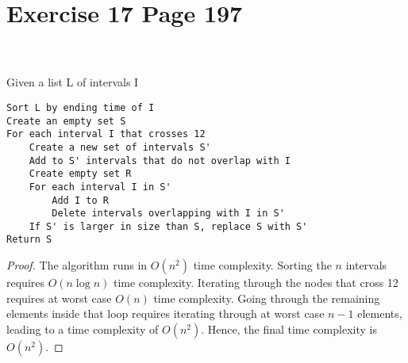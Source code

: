 \documentclass[11pt]{article}
\begin{document}
\section*{Exercise 17 Page 197}
 \\ \\
Given a list L of intervals I 
\begin{lstlisting}
Sort L by ending time of I
Create an empty set S
For each interval I that crosses 12
	Create a new set of intervals S'
	Add to S' intervals that do not overlap with I
	Create empty set R
	For each interval I in S'
		Add I to R
		Delete intervals overlapping with I in S'
	If S' is larger in size than S, replace S with S'
Return S
\end{lstlisting}
\begin{proof}
The algorithm runs in $O(n^2)$ time complexity. Sorting the $n$ intervals requires $O(n \log n)$ time complexity. Iterating through the nodes that cross 12 requires at worst case $O(n)$ time complexity. Going through the remaining elements inside that loop requires iterating through at worst case $n-1$ elements, leading to a time complexity of $O(n^2)$. Hence, the final time complexity is $O(n^2)$.
\end{proof}
\newpage
\end{document}
